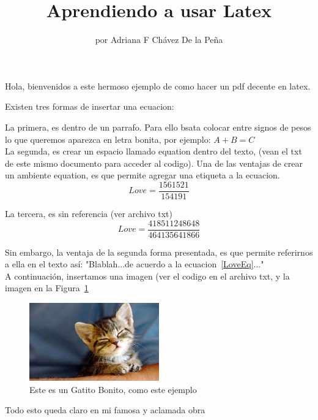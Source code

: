 \documentclass[letterpaper]{article}
\begin{document}
\title{Aprendiendo a usar Latex}
\author{por Adriana F Chávez De la Peña}
\maketitle

Hola, bienvenidos a este hermoso ejemplo de como hacer un pdf decente en latex.



Existen tres formas de insertar una ecuacion:



La primera, es dentro de un parrafo. Para ello bsata colocar entre signos de pesos lo que queremos aparezca en letra bonita, por ejemplo: $A+B=C$ \\

La segunda, es crear un espacio llamado equation dentro del texto, (vean el txt de este mismo documento para acceder al codigo). Una de las ventajas de crear un ambiente equation, es que permite agregar una etiqueta a la ecuacion. \\

\begin{equation}
Love=\frac{1561521}{154191}
\label{LoveEq}
\end{equation}

La tercera,  es sin referencia (ver archivo txt)\\


\[Love=\frac{418511248648}{464135641866}\]


Sin embargo, la ventaja de la segunda forma presentada, es que permite referirnos a ella en el texto así:  "Blablah...de acuerdo a la ecuacion~\ref{LoveEq}..."\\

A continuación, insertamos una imagen (ver el codigo en el archivo txt, y la imagen en la Figura~\ref{Gatito1}



\begin{figure}
\centering
\includegraphics[width=0.5\textwidth]{Imagenes/Gatitos.jpeg}
\caption{Este es un Gatito Bonito, como este ejemplo}
\label{Gatito1}
\end{figure}


Todo esto queda claro en mi famosa y aclamada obra \parencite{chavez2016}



\end{document}
